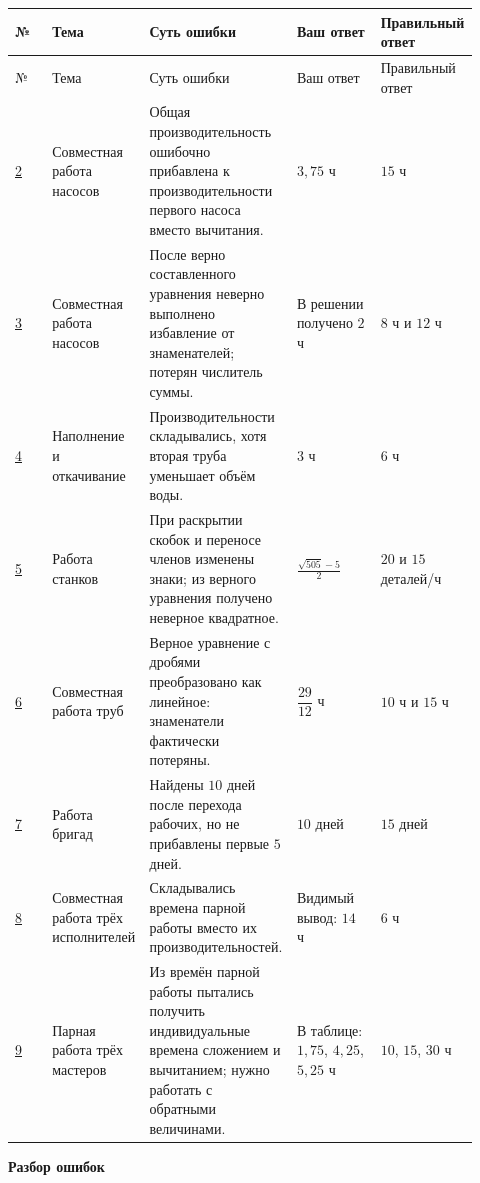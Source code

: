 \documentclass[12pt,a4paper]{article}
\begin{document}
\begin{longtable}{>{\centering\arraybackslash}p{0.08\linewidth} p{0.18\linewidth} p{0.30\linewidth} p{0.18\linewidth} p{0.18\linewidth}}
\toprule
№ & Тема & Суть ошибки & Ваш ответ & Правильный ответ \\
\midrule
\endfirsthead
\toprule
№ & Тема & Суть ошибки & Ваш ответ & Правильный ответ \\
\midrule
\endhead
\hyperref[task:2]{2} & Совместная работа насосов & Общая производительность ошибочно прибавлена к производительности первого насоса вместо вычитания. & $3{,}75$ ч & $15$ ч \\
\midrule
\hyperref[task:3]{3} & Совместная работа насосов & После верно составленного уравнения неверно выполнено избавление от знаменателей; потерян числитель суммы. & В решении получено $2$ ч & $8$ ч и $12$ ч \\
\midrule
\hyperref[task:4]{4} & Наполнение и откачивание & Производительности складывались, хотя вторая труба уменьшает объём воды. & $3$ ч & $6$ ч \\
\midrule
\hyperref[task:5]{5} & Работа станков & При раскрытии скобок и переносе членов изменены знаки; из верного уравнения получено неверное квадратное. & {\scriptsize$\frac{\sqrt{505}-5}{2}$} & $20$ и $15$ деталей/ч \\
\midrule
\hyperref[task:6]{6} & Совместная работа труб & Верное уравнение с дробями преобразовано как линейное: знаменатели фактически потеряны. & $\dfrac{29}{12}$ ч & $10$ ч и $15$ ч \\
\midrule
\hyperref[task:7]{7} & Работа бригад & Найдены $10$ дней после перехода рабочих, но не прибавлены первые $5$ дней. & $10$ дней & $15$ дней \\
\midrule
\hyperref[task:8]{8} & Совместная работа трёх исполнителей & Складывались времена парной работы вместо их производительностей. & Видимый вывод: $14$ ч & $6$ ч \\
\midrule
\hyperref[task:9]{9} & Парная работа трёх мастеров & Из времён парной работы пытались получить индивидуальные времена сложением и вычитанием; нужно работать с обратными величинами. & В таблице: $1{,}75$, $4{,}25$, $5{,}25$ ч & $10$, $15$, $30$ ч \\
\bottomrule
\end{longtable}
\setlength{\tabcolsep}{6pt}
\normalsize

\newpage
\vspace*{0.38\textheight}
\begin{center}
{\LARGE\bfseries Разбор ошибок}
\end{center}
\newpage
\end{document}
